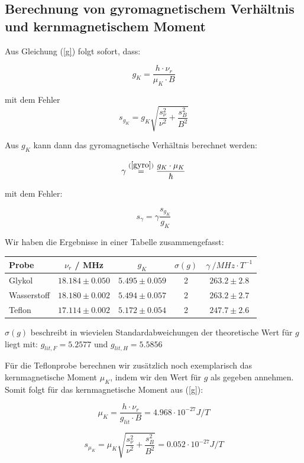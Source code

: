 
\subsection{Berechnung von gyromagnetischem Verhältnis und kernmagnetischem Moment}

Aus Gleichung (\ref{g}) folgt sofort, dass:

\begin{equation} g_K = \frac{h\cdot\nu_r}{\mu_K\cdot B} \end{equation}

mit dem Fehler $$s_{g_K} = g_K\sqrt{\frac{s_\nu^2}{\nu^2}+\frac{s_B^2}{B^2}}$$

Aus $g_K$ kann dann das gyromagnetische Verhältnis berechnet werden:

$$\gamma  \stackrel{(\ref{gyro})}{=} \frac{g_K\cdot\mu_K}{\hbar}$$

mit dem Fehler:

$$s_\gamma = \gamma \frac{s_{g_K}}{g_K}$$

Wir haben die Ergebnisse in einer Tabelle zusammengefasst:

\begin{center}
\begin{tabular}{| l | c | c | c | c |} \hline
Probe & $\nu_r$ / MHz & $g_K$ & $\sigma(g)$ & $\gamma\ / MHz\cdot T^{-1}$\\ \hline
Glykol & $18.184 \pm 0.050$ & $5.495 \pm 0.059$ & 2 & $263.2 \pm 2.8$ \\
Wasserstoff &$18.180 \pm 0.002$ & $ 5.494 \pm 0.057 $ & 2 & $263.2 \pm 2.7$ \\
Teflon & $17.114 \pm 0.002$ &  $5.172 \pm 0.054$ & 2 & $247.7 \pm 2.6$\\ \hline
\end{tabular}
\end{center}

$\sigma(g)$ beschreibt in wievielen Standardabweichungen der theoretische Wert für $g$ liegt mit: $g_{lit,F} = 5.2577$ und $g_{lit,H} = 5.5856$

Für die Teflonprobe berechnen wir zusätzlich noch exemplarisch das kernmagnetische Moment $\mu_K$, indem wir den Wert für $g$ als gegeben annehmen. Somit folgt für das kernmagnetische Moment aus (\ref{g}):

$$\mu_K =  \frac{h\cdot\nu_r}{g_{lit}\cdot B} = 4.968\cdot 10^{-27} J/T$$

$$s_{\mu_K} = \mu_K\sqrt{\frac{s_\nu^2}{\nu^2} + \frac{s_B^2}{B^2}} = 0.052\cdot 10^{-27} J/T$$

